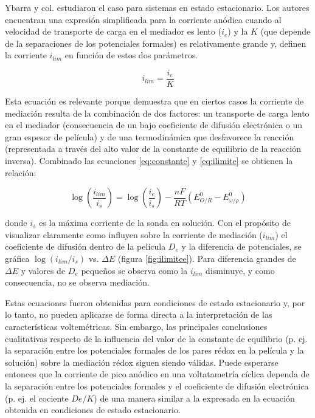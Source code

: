 		Ybarra y col.\cite{ybarra2008} estudiaron el caso para sistemas en estado estacionario. Los autores encuentran una expresión simplificada para la corriente anódica cuando al velocidad de transporte de carga en el mediador es lento ($i_e$) y la $K$ (que depende de la separaciones de los potenciales formales) es relativamente grande y, definen la corriente $i_{lim}$ en función de estos dos parámetros.

		\begin{equation}
		i_{lim}=\frac{i_e}{K}
		\label{eq:ilimite}
		\end{equation}

		Esta ecuación es relevante porque demuestra que en ciertos casos la corriente de mediación resulta de la combinación de dos factores: un transporte de carga lento en el mediador (consecuencia de un bajo coeficiente de difusión electrónica o un gran espesor de película) y de una termodinámica que desfavorece la reacción (representada a través del alto valor de la constante de equilibrio de la reacción inversa).\cite{ybarra2005}
		Combinado las ecuaciones \ref{eq:constante} y \ref{eq:ilimite} se obtienen la relación:

		\begin{equation}
			\log\left({\frac{i_{lim}}{i_s}}\right) =\log\left({\frac{i_e}{i_s}}\right)-{\frac{nF}{RT}}\left( E^0_{O/R} - E^0_{\omega / \rho} \right)
			\label{eq:delgrafico}
		\end{equation}

		\noindent donde $i_s$ es la máxima corriente de la sonda en solución. Con el propósito de visualizar claramente como influyen sobre la corriente de mediación ($i_{lim}$) el coeficiente de difusión dentro de la película $D_e$ y la diferencia de potenciales, se gráfica $\log(i_{lim}/i_{s})$ vs. $\Delta E$ (figura \ref{fig:ilimitee}). Para diferencia grandes de $\Delta E$ y valores de $D_e$ pequeños se observa como la $i_{lim}$ disminuye, y como consecuencia, no se observa mediación.

		Estas ecuaciones fueron obtenidas para condiciones de estado estacionario y, por lo tanto, no pueden aplicarse de forma directa a la interpretación de las características voltemétricas. Sin embargo, las principales conclusiones cualitativas respecto de la influencia del valor de la constante de equilibrio (p. ej. la separación entre los potenciales formales de los pares rédox en la película y la solución) sobre la mediación rédox siguen siendo válidas. Puede esperarse entonces que la corriente de pico anódico en una voltatametría cíclica dependa de la separación entre los potenciales formales y el coeficiente de difusión electrónica (p. ej. el cociente $De/K$) de una manera similar a la expresada en la ecuación obtenida en condiciones de estado estacionario. 
		
